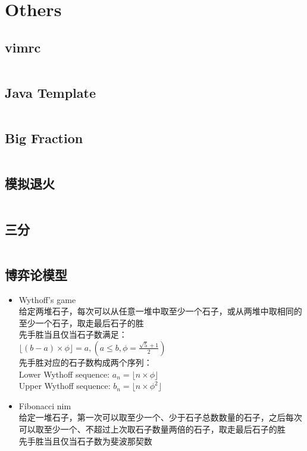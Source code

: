 \chapter{Others}
\section{vimrc}
\inputminted[linenos=true,frame=leftline]{vim}{Others/.vimrc}
\section{Java Template}
\inputminted[linenos=true,frame=leftline]{java}{Others/Template.java}
\section{Big Fraction}
\inputminted[linenos=true,frame=leftline]{kotlin}{Others/big_fraction.kt}
\section{模拟退火}
\inputminted[linenos=true,frame=leftline]{cpp}{Others/simulated_annealing.cpp}
\section{三分}
\inputminted[linenos=true,frame=leftline]{cpp}{Others/cubic_search.cpp}
\section{博弈论模型}
\begin{itemize}
	\item Wythoff's game\\给定两堆石子，每次可以从任意一堆中取至少一个石子，或从两堆中取相同的至少一个石子，取走最后石子的胜\\先手胜当且仅当石子数满足：\\$\lfloor (b - a) \times \phi \rfloor=a, (a \leq b, \phi = \frac{\sqrt{5} + 1}{2})$\\先手胜对应的石子数构成两个序列：\\Lower Wythoff sequence: $a_n = \lfloor n \times \phi \rfloor$\\Upper Wythoff sequence: $b_n = \lfloor n \times \phi ^ 2 \rfloor$
	\item Fibonacci nim\\给定一堆石子，第一次可以取至少一个、少于石子总数数量的石子，之后每次可以取至少一个、不超过上次取石子数量两倍的石子，取走最后石子的胜\\先手胜当且仅当石子数为斐波那契数
\end{itemize}